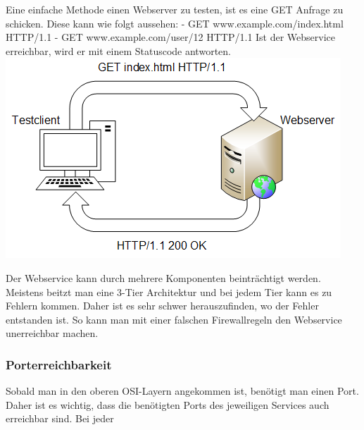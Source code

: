 \documentclass[a4,12pt]{scrartcl}
\begin{document}
Eine einfache Methode einen Webserver zu testen, ist es eine GET Anfrage zu schicken. Diese kann wie folgt aussehen:
- GET www.example.com/index.html HTTP/1.1 \newline
- GET www.example.com/user/12 HTTP/1.1 \newline
Ist der Webservice erreichbar, wird er mit einem Statuscode antworten.
\includegraphics[scale=1]{figures/httpget.png}

Der Webservice kann durch mehrere Komponenten beinträchtigt werden. Meistens beitzt man eine 3-Tier Architektur und bei jedem Tier kann es zu Fehlern kommen. Daher ist es sehr schwer herauszufinden, wo der Fehler entstanden ist. So kann man mit einer falschen Firewallregeln den Webservice unerreichbar machen.

\subsubsection{Porterreichbarkeit}
Sobald man in den oberen OSI-Layern angekommen ist, benötigt man einen Port. Daher ist es wichtig, dass die benötigten Ports des jeweiligen Services auch erreichbar sind. Bei jeder 
\end{document}
